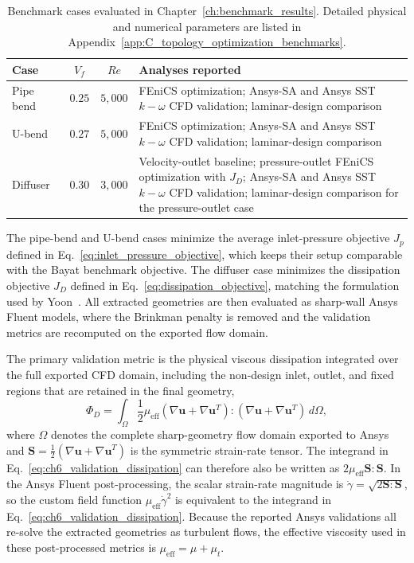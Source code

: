 \begin{table}[!ht]
	\centering
	\footnotesize
	\caption{Benchmark cases evaluated in Chapter~\ref{ch:benchmark_results}. Detailed physical and numerical parameters are listed in Appendix~\ref{app:C_topology_optimization_benchmarks}.}
	\label{tab:ch6_benchmark_cases}
	\renewcommand{\arraystretch}{1.2}
		\begin{tabularx}{\textwidth}{l c c >{\raggedright\arraybackslash}X}
		\hline
		\textbf{Case} & \textbf{$V_f$} & \textbf{$Re$} & \textbf{Analyses reported} \\
		\hline
			Pipe bend~\cite{Bayat2026} & $0.25$ & $5{,}000$ & FEniCS optimization; Ansys-SA and Ansys SST $k-\omega$ CFD validation; laminar-design comparison \\
			U-bend~\cite{Bayat2026} & $0.27$ & $5{,}000$ & FEniCS optimization; Ansys-SA and Ansys SST $k-\omega$ CFD validation; laminar-design comparison \\
			Diffuser~\cite{Yoon2016} & $0.30$ & $3{,}000$ & Velocity-outlet baseline; pressure-outlet FEniCS optimization with $J_D$; Ansys-SA and Ansys SST $k-\omega$ CFD validation; laminar-design comparison for the pressure-outlet case \\
		\hline
	\end{tabularx}
\end{table}

The pipe-bend and U-bend cases minimize the average inlet-pressure objective $J_p$ defined in Eq.~\ref{eq:inlet_pressure_objective}, which keeps their setup comparable with the Bayat benchmark objective. The diffuser case minimizes the dissipation objective $J_D$ defined in Eq.~\ref{eq:dissipation_objective}, matching the formulation used by Yoon~\cite{Yoon2016}. All extracted geometries are then evaluated as sharp-wall Ansys Fluent models, where the Brinkman penalty is removed and the validation metrics are recomputed on the exported flow domain.

The primary validation metric is the physical viscous dissipation integrated over the full exported CFD domain, including the non-design inlet, outlet, and fixed regions that are retained in the final geometry,
\begin{equation}
	\Phi_D = \int_{\Omega}
	\frac{1}{2} \mu_{\mathrm{eff}}
	\left(\nabla\mathbf{u}+\nabla\mathbf{u}^{T}\right):
	\left(\nabla\mathbf{u}+\nabla\mathbf{u}^{T}\right)
	\,d\Omega ,
	\label{eq:ch6_validation_dissipation}
\end{equation}
where $\Omega$ denotes the complete sharp-geometry flow domain exported to Ansys and $\mathbf{S}=\frac{1}{2}\left(\nabla\mathbf{u}+\nabla\mathbf{u}^{T}\right)$ is the symmetric strain-rate tensor. The integrand in Eq.~\ref{eq:ch6_validation_dissipation} can therefore also be written as $2\mu_{\mathrm{eff}}\mathbf{S}:\mathbf{S}$. In the Ansys Fluent post-processing, the scalar strain-rate magnitude is $\dot{\gamma}=\sqrt{2\mathbf{S}:\mathbf{S}}$, so the custom field function $\mu_{\mathrm{eff}}\dot{\gamma}^{2}$ is equivalent to the integrand in Eq.~\ref{eq:ch6_validation_dissipation}. Because the reported Ansys validations all re-solve the extracted geometries as turbulent flows, the effective viscosity used in these post-processed metrics is $\mu_{\mathrm{eff}}=\mu+\mu_t$.

